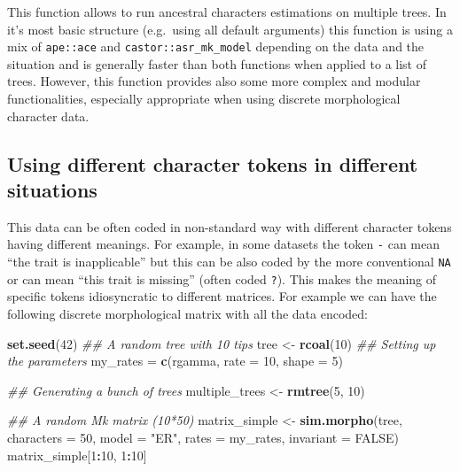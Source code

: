 \documentclass[
]{book}
\newenvironment{Shaded}{\begin{snugshade}}{\end{snugshade}}
\newcommand{\CommentTok}[1]{\textcolor[rgb]{0.56,0.35,0.01}{\textit{#1}}}
\newcommand{\DataTypeTok}[1]{\textcolor[rgb]{0.13,0.29,0.53}{#1}}
\newcommand{\DecValTok}[1]{\textcolor[rgb]{0.00,0.00,0.81}{#1}}
\newcommand{\KeywordTok}[1]{\textcolor[rgb]{0.13,0.29,0.53}{\textbf{#1}}}
\newcommand{\NormalTok}[1]{#1}
\newcommand{\OperatorTok}[1]{\textcolor[rgb]{0.81,0.36,0.00}{\textbf{#1}}}
\newcommand{\OtherTok}[1]{\textcolor[rgb]{0.56,0.35,0.01}{#1}}
\newcommand{\StringTok}[1]{\textcolor[rgb]{0.31,0.60,0.02}{#1}}
\begin{document}
This function allows to run ancestral characters estimations on multiple trees.
In it's most basic structure (e.g.~using all default arguments) this function is using a mix of \texttt{ape::ace} and \texttt{castor::asr\_mk\_model} depending on the data and the situation and is generally faster than both functions when applied to a list of trees.
However, this function provides also some more complex and modular functionalities, especially appropriate when using discrete morphological character data.

\hypertarget{using-different-character-tokens-in-different-situations}{%
\subsection{Using different character tokens in different situations}\label{using-different-character-tokens-in-different-situations}}

This data can be often coded in non-standard way with different character tokens having different meanings.
For example, in some datasets the token \texttt{-} can mean ``the trait is inapplicable'' but this can be also coded by the more conventional \texttt{NA} or can mean ``this trait is missing'' (often coded \texttt{?}).
This makes the meaning of specific tokens idiosyncratic to different matrices.
For example we can have the following discrete morphological matrix with all the data encoded:

\begin{Shaded}
\begin{Highlighting}[]
\KeywordTok{set.seed}\NormalTok{(}\DecValTok{42}\NormalTok{)}
\CommentTok{\#\# A random tree with 10 tips}
\NormalTok{tree \textless{}{-}}\StringTok{ }\KeywordTok{rcoal}\NormalTok{(}\DecValTok{10}\NormalTok{)}
\CommentTok{\#\# Setting up the parameters}
\NormalTok{my\_rates =}\StringTok{ }\KeywordTok{c}\NormalTok{(rgamma, }\DataTypeTok{rate =} \DecValTok{10}\NormalTok{, }\DataTypeTok{shape =} \DecValTok{5}\NormalTok{)}

\CommentTok{\#\# Generating a bunch of trees}
\NormalTok{multiple\_trees \textless{}{-}}\StringTok{ }\KeywordTok{rmtree}\NormalTok{(}\DecValTok{5}\NormalTok{, }\DecValTok{10}\NormalTok{)}

\CommentTok{\#\# A random Mk matrix (10*50)}
\NormalTok{matrix\_simple \textless{}{-}}\StringTok{ }\KeywordTok{sim.morpho}\NormalTok{(tree, }\DataTypeTok{characters =} \DecValTok{50}\NormalTok{, }\DataTypeTok{model =} \StringTok{"ER"}\NormalTok{, }\DataTypeTok{rates =}\NormalTok{ my\_rates,}
                            \DataTypeTok{invariant =} \OtherTok{FALSE}\NormalTok{)}
\NormalTok{matrix\_simple[}\DecValTok{1}\OperatorTok{:}\DecValTok{10}\NormalTok{, }\DecValTok{1}\OperatorTok{:}\DecValTok{10}\NormalTok{]}
\end{Highlighting}
\end{Shaded}
\end{document}

